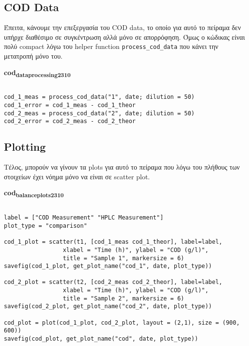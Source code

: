 \documentclass[11pt]{article}
\begin{document}
\subsection{COD Data}
\label{sec:org254ebf5}
Έπειτα, κάνουμε την επεξεργασία του COD data, το οποίο για αυτό το πείραμα δεν υπήρχε διαθέσιμο σε συγκέντρωση αλλά μόνο σε απορρόφηση. Όμως ο κώδικας είναι πολύ compact λόγω του helper function \texttt{process\_cod\_data} που κάνει την μετατροπή μόνο του.

\textbf{cod\textsubscript{data}\textsubscript{processing}\textsubscript{23}\textsubscript{10}}
\begin{verbatim}

cod_1_meas = process_cod_data("1", date; dilution = 50)
cod_1_error = cod_1_meas - cod_1_theor
cod_2_meas = process_cod_data("2", date; dilution = 50)
cod_2_error = cod_2_meas - cod_2_theor

\end{verbatim}

\subsection{Plotting}
\label{sec:org962ee42}
Τέλος, μπορούν να γίνουν τα plots για αυτό το πείραμα που λόγω του πλήθους των στοιχείων έχει νόημα μόνο να είναι σε scatter plot.

\textbf{cod\textsubscript{balance}\textsubscript{plots}\textsubscript{23}\textsubscript{10}}
\begin{verbatim}

label = ["COD Measurement" "HPLC Measurement"]
plot_type = "comparison"

cod_1_plot = scatter(t1, [cod_1_meas cod_1_theor], label=label,
                 xlabel = "Time (h)", ylabel = "COD (g/l)",
                 title = "Sample 1", markersize = 6)
savefig(cod_1_plot, get_plot_name("cod_1", date, plot_type))

cod_2_plot = scatter(t2, [cod_2_meas cod_2_theor], label=label,
                 xlabel = "Time (h)", ylabel = "COD (g/l)",
                 title = "Sample 2", markersize = 6)
savefig(cod_2_plot, get_plot_name("cod_2", date, plot_type))

cod_plot = plot(cod_1_plot, cod_2_plot, layout = (2,1), size = (900, 600))
savefig(cod_plot, get_plot_name("cod", date, plot_type))

\end{verbatim}
\end{document}
